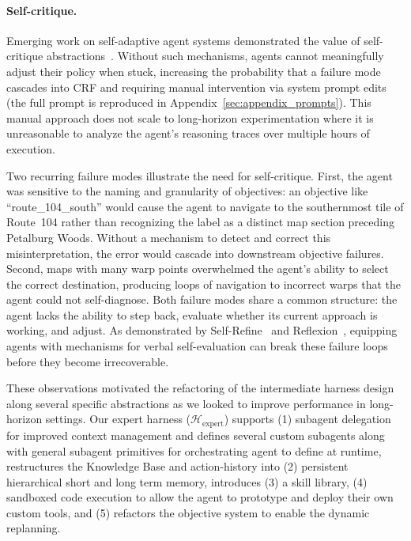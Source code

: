 \paragraph{Self-critique.} Emerging work on self-adaptive agent systems demonstrated the value of self-critique abstractions~\citep{madaan2023selfrefine, shinn2023reflexion}. Without such mechanisms, agents cannot meaningfully adjust their policy when stuck, increasing the probability that a failure mode cascades into CRF and requiring manual intervention via system prompt edits (the full prompt is reproduced in Appendix~\ref{sec:appendix_prompts}). This manual approach does not scale to long-horizon experimentation where it is unreasonable to analyze the agent's reasoning traces over multiple hours of execution.

Two recurring failure modes illustrate the need for self-critique. First, the agent was sensitive to the naming and granularity of objectives: an objective like ``route\_104\_south'' would cause the agent to navigate to the southernmost tile of Route~104 rather than recognizing the label as a distinct map section preceding Petalburg Woods. Without a mechanism to detect and correct this misinterpretation, the error would cascade into downstream objective failures. Second, maps with many warp points overwhelmed the agent's ability to select the correct destination, producing loops of navigation to incorrect warps that the agent could not self-diagnose. Both failure modes share a common structure: the agent lacks the ability to step back, evaluate whether its current approach is working, and adjust. As demonstrated by Self-Refine~\citep{madaan2023selfrefine} and Reflexion~\citep{shinn2023reflexion}, equipping agents with mechanisms for verbal self-evaluation can break these failure loops before they become irrecoverable.

These observations motivated the refactoring of the intermediate harness design along several specific abstractions as we looked to improve performance in long-horizon settings. Our expert harness ($\mathcal{H}_{\text{expert}}$) supports (1) subagent delegation for improved context management and defines several custom subagents along with general subagent primitives for orchestrating agent to define at runtime, restructures the Knowledge Base and action-history into (2) persistent hierarchical short and long term memory, introduces (3) a skill library, (4) sandboxed code execution to allow the agent to prototype and deploy their own custom tools, and (5) refactors the objective system to enable the dynamic replanning.


